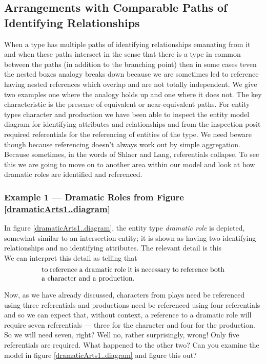 \subsection{Arrangements with Comparable Paths of Identifying Relationships}
When a type has multiple paths of identifying relationships emanating from it and when these paths intersect in the sense that there is a type in common between the paths (in addition to the
branching point) then in some cases teven the nested boxes analogy breaks down
because we are sometimes led to reference having nested references which overlap and are not totally independent. We give two examples one where the analogy holds up and one where it does not. The key characteristic is the presense of equivalent or near-equivalent paths.
For entity types character and production we have been able to inspect the entity model diagram for identifying  attributes and relationships and from the inspection posit required referentials  for the referencing of entities of the type.
We need beware though because referencing doesn't always work out by simple aggregation. Because sometimes,
in the words of Shlaer and Lang, referentials collapse. 
To see this we are going to move on to another area within our model and look at how dramatic roles are identified and referenced.

 \subsubsection{Example 1 --- Dramatic Roles from Figure \ref{dramaticArts1..diagram}}
\mynote
In figure \ref{dramaticArts1..diagram}, the entity type \textit{dramatic role} is
depicted, somewhat similar to an intersection entity; it is shown as having
two identifying relationships and no identifying attributes.
The relevant detail is  this
\begin{equation*}

\end{equation*}
We can interpret this detail as telling that
\begin{equation}
\label{DramaticRoleReferencing}
\text{\parbox{9cm}{to reference a dramatic role it is necessary  
to reference both a character and  a production.}}
\end{equation}

Now, as we have already discussed, characters from plays need be referenced using three referentials
and productions need be referenced using four referentials 
and so we can expect that, without context, a reference to
a dramatic role will require seven referentials
 --- three for the character and four for the production. 
So we will need seven, right?
 Well no, rather surprisingly, wrong! Only five referentials are required. 
 What happened to the other two? Can you examine the model in figure \ref{dramaticArts1..diagram} and figure this out?


